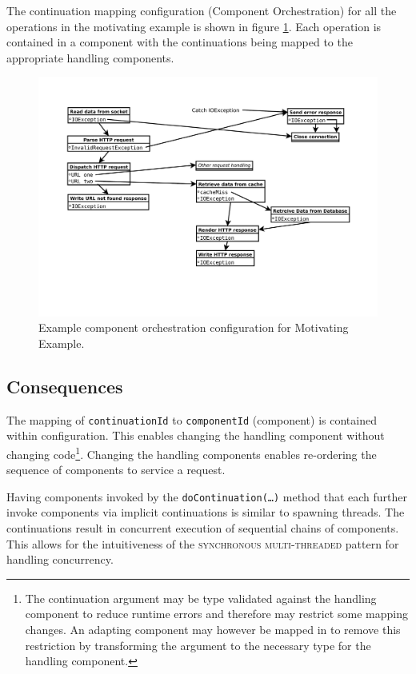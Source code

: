\documentclass[prodmode]{style/acmlarge}
\begin{document}
The continuation mapping configuration (Component Orchestration) for all the
operations in the motivating example is shown in figure
\ref{fig:ExampleComponentOrchestration}.  Each operation is contained in a
component with the continuations being mapped to the appropriate handling
components.
 
\begin{figure}[!t]
\centering
\includegraphics[width=4.5in]{ContinuationInjectionComponentOrchestration}
\caption{Example component orchestration configuration for Motivating Example.}
\label{fig:ExampleComponentOrchestration}
\end{figure}


\subsection{Consequences}

The mapping of \texttt{continuationId} to \texttt{componentId} (component) is
contained within configuration.  This enables changing the handling component
without changing code\footnote{The continuation argument may be type validated
against the handling component to reduce runtime errors and therefore may
restrict some mapping changes.  An adapting component may however be mapped in
to remove this restriction by transforming the argument to the necessary type
for the handling component.}.  Changing the handling components enables
re-ordering the sequence of components to service a request.

Having components invoked by the \texttt{doContinuation(\ldots)} method that
each further invoke components via implicit continuations is similar to spawning
threads.  The continuations result in concurrent execution of sequential chains
of components.  This allows for the intuitiveness of the \textsc{synchronous
multi-threaded} pattern \cite{proactor} for handling concurrency.
\end{document}
